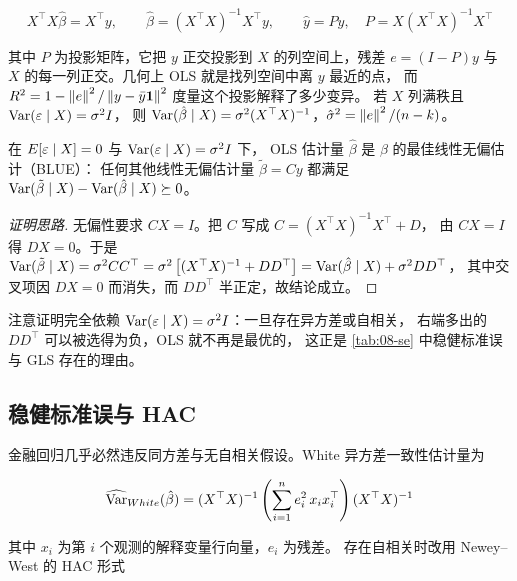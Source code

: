 \begin{equation}
  X^{\top}X\hat{\beta} = X^{\top}y, \qquad
  \hat{\beta} = (X^{\top}X)^{-1}X^{\top}y, \qquad
  \hat{y} = Py, \quad P = X(X^{\top}X)^{-1}X^{\top}
  \label{eq:08-ols}
\end{equation}

其中 $P$ 为投影矩阵，它把 $y$ 正交投影到 $X$ 的列空间上，残差
$e = (I - P)y$ 与 $X$ 的每一列正交。几何上 OLS 就是找列空间中离 $y$ 最近的点，
而 $R^{2} = 1 - \left\lVert e \right\rVert^{2}/\left\lVert y - \bar{y}\mathbf{1} \right\rVert^{2}$ 度量这个投影解释了多少变异。
若 $X$ 列满秩且 $\operatorname{Var}(\varepsilon \mid X) = \sigma^{2}I$，
则 $\operatorname{Var}(\hat{\beta} \mid X) = \sigma^{2}(X^{\top}X)^{-1}$，$\hat{\sigma}^{2} = \left\lVert e \right\rVert^{2}/(n-k)$。

\begin{theorem}\label{thm:08-gm}
在 $E[\varepsilon \mid X] = 0$ 与 $\operatorname{Var}(\varepsilon \mid X) = \sigma^{2}I$ 下，
OLS 估计量 $\hat{\beta}$ 是 $\beta$ 的最佳线性无偏估计（BLUE）：
任何其他线性无偏估计量 $\tilde{\beta} = Cy$ 都满足
$\operatorname{Var}(\tilde{\beta} \mid X) - \operatorname{Var}(\hat{\beta} \mid X) \succeq 0$。
\end{theorem}

\begin{proof}[证明思路]
无偏性要求 $CX = I$。把 $C$ 写成 $C = (X^{\top}X)^{-1}X^{\top} + D$，
由 $CX = I$ 得 $DX = 0$。于是
$\operatorname{Var}(\tilde{\beta}\mid X) = \sigma^{2}CC^{\top}
= \sigma^{2}\left[(X^{\top}X)^{-1} + DD^{\top}\right]
= \operatorname{Var}(\hat{\beta}\mid X) + \sigma^{2}DD^{\top}$，
其中交叉项因 $DX = 0$ 而消失，而 $DD^{\top}$ 半正定，故结论成立。
\end{proof}

注意证明完全依赖 $\operatorname{Var}(\varepsilon\mid X) = \sigma^{2}I$：一旦存在异方差或自相关，
右端多出的 $DD^{\top}$ 可以被选得为负，OLS 就不再是最优的，
这正是 \cref{tab:08-se} 中稳健标准误与 GLS 存在的理由。

\subsection{稳健标准误与 HAC}

金融回归几乎必然违反同方差与无自相关假设。White 异方差一致性估计量为

\begin{equation}
  \widehat{\operatorname{Var}}_{White}(\hat{\beta}) =
  (X^{\top}X)^{-1}\left(\sum_{i=1}^{n} e_i^{2}\, x_i x_i^{\top}\right)(X^{\top}X)^{-1}
  \label{eq:08-white}
\end{equation}

其中 $x_i$ 为第 $i$ 个观测的解释变量行向量，$e_i$ 为残差。
存在自相关时改用 Newey--West 的 HAC 形式

